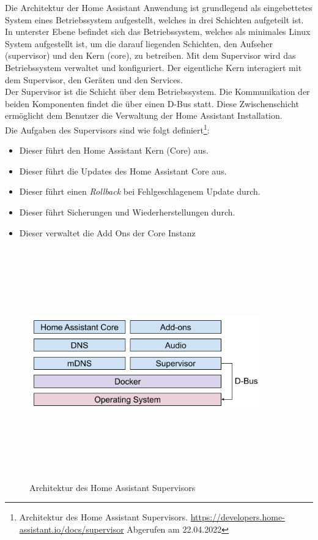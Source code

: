     Die Architektur der Home Assistant Anwendung ist grundlegend als eingebettetes System eines Betriebssystem aufgestellt, welches in 
    drei Schichten aufgeteilt ist. In unterster Ebene befindet sich das Betriebssystem, welches als minimales Linux System aufgestellt 
    ist, um die darauf liegenden Schichten, den Aufseher (supervisor) und den Kern (core), zu betreiben. Mit dem Supervisor wird das 
    Betriebssystem verwaltet und konfiguriert. Der eigentliche Kern interagiert mit dem Supervisor, den Geräten und den Services. 
    \\
    \linebreak
    Der Supervisor ist die Schicht über dem Betriebssystem. Die Kommunikation der beiden Komponenten findet die über einen D-Bus statt. Diese Zwischenschicht ermöglicht dem 
    Benutzer die Verwaltung der Home Assistant Installation. 
    \\
    Die Aufgaben des Supervisors sind wie folgt 
    definiert\footnote{Architektur des Home Assistant Supervisors. \url{https://developers.home-assistant.io/docs/supervisor} Abgerufen am 22.04.2022}: 
    \begin{itemize}
        \item Dieser führt den Home Assistant Kern (Core) aus.
        \item Dieser führt die Updates des Home Assistant Core aus.
        \item Dieser führt einen \textit{Rollback} bei Fehlgeschlagenem Update durch.
        \item Dieser führt Sicherungen und Wiederherstellungen durch.
        \item Dieser verwaltet die Add Ons der Core Instanz
    \end{itemize}
    \begin{figure}[hbt!]
        \centering
        \includegraphics[width=10cm,height=10cm,keepaspectratio]{images/ha_architecture_2020.png}
        \caption{Architektur des Home Assistant Supervisors \cite{haos-supervisor}}
        \label{fig:architectureHAOS}
    \end{figure}
